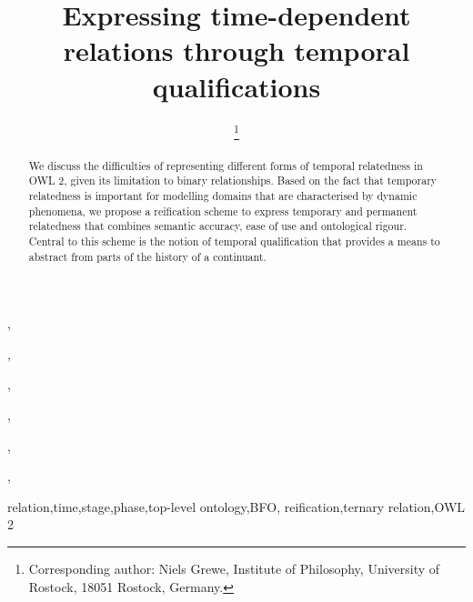 \documentclass{ao2e}
\begin{document}
\begin{frontmatter}



\title{Expressing time-dependent relations through temporal qualifications}
\maketitle
\author[HRO]{ %
\thanks{Corresponding author: Niels Grewe, Institute of Philosophy, University
of Rostock, 18051 Rostock, Germany.}},
\author[GV]{ },
\author[HRO]{ },
\author[XXX]{ },
\author[SUNY]{ },
\author[LBL]{ },
\author[GRZ,FB]{ }
\address[GRZ]{Institute for Medical Informatics,
Statistics and Documentation, Medical University of Graz, Austria}
\address[FB]{Institute of Medical Biometry and Medical Informatics, University Medical Center Freiburg, Germany}
\address[HRO]{Institute of Philosophy, University of Rostock, Germany}
\address[GV]{Institute of Philosophy, University of Geneva, Switzerland}
\address[LBL]{Genomics Division, Lawrence Berkeley National Laboratory, Berkeley, CA, USA}
\address[SUNY]{State University of New York, Buffalo,
NY, USA}
\address[XXX]{XXX}

\begin{abstract}
We discuss the difficulties of representing different forms of temporal
relatedness in OWL 2, given its limitation to binary relationships. Based on the
fact that temporary relatedness is important for modelling domains that are
characterised by dynamic phenomena, we propose a reification scheme to express
temporary and permanent relatedness that combines semantic accuracy, ease of use
and ontological rigour. Central to this scheme is the notion of temporal
qualification that provides a means to abstract from parts of the history of a
continuant.
\end{abstract}

\begin{keyword}
relation\sep time\sep stage\sep phase\sep top-level ontology\sep BFO\sep
reification\sep ternary relation\sep OWL 2
\end{keyword}
\end{frontmatter}
\end{document}
